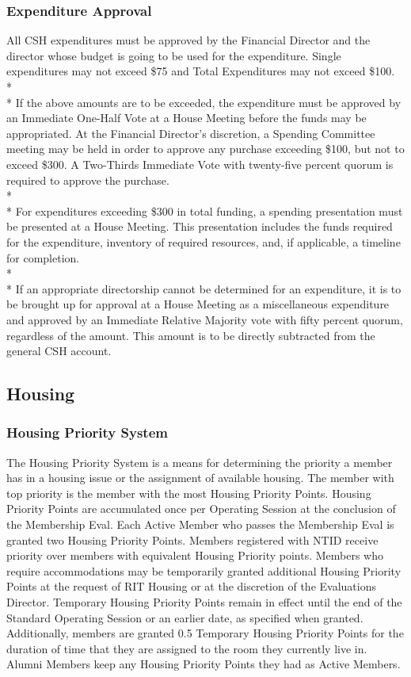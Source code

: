 \documentclass{article}
\newcommand{\asection}[1]{\subsection{#1} \label{#1}}
\newcommand{\asubsection}[1]{\subsubsection{#1} \label{#1}}
\begin{document}
\asubsection{Expenditure Approval}
All CSH expenditures must be approved by the Financial Director and the director whose budget is going to be used for the expenditure.
Single expenditures may not exceed \$75 and Total Expenditures may not exceed \$100.
\\* \\*
If the above amounts are to be exceeded, the expenditure must be approved by an Immediate One-Half Vote at a House Meeting before the funds may be appropriated.
At the Financial Director's discretion, a Spending Committee meeting may be held in order to approve any purchase exceeding \$100, but not to exceed \$300.
A Two-Thirds Immediate Vote with twenty-five percent quorum is required to approve the purchase.
\\*\\*
For expenditures exceeding \$300 in total funding, a spending presentation must be presented at a House Meeting.
This presentation includes the funds required for the expenditure, inventory of required resources, and, if applicable, a timeline for completion.
\\* \\*
If an appropriate directorship cannot be determined for an expenditure, it is to be brought up for approval at a House Meeting as a miscellaneous expenditure and approved by an Immediate Relative Majority vote with fifty percent quorum, regardless of the amount.
This amount is to be directly subtracted from the general CSH account.
\asection{Housing}

\asubsection{Housing Priority System}
The Housing Priority System is a means for determining the priority a member has in a housing issue or the assignment of available housing.
The member with top priority is the member with the most Housing Priority Points.
Housing Priority Points are accumulated once per Operating Session at the conclusion of the Membership Eval.
Each Active Member who passes the Membership Eval is granted two Housing Priority Points. 
Members registered with NTID receive priority over members with equivalent Housing Priority points. %
Members who require accommodations may be temporarily granted additional Housing Priority Points at the request of RIT Housing or at the discretion of the Evaluations Director. 
Temporary Housing Priority Points remain in effect until the end of the Standard Operating Session or an earlier date, as specified when granted.
Additionally, members are granted 0.5 Temporary Housing Priority Points for the duration of time that they are assigned to the room they currently live in. 
Alumni Members keep any Housing Priority Points they had as Active Members.
\end{document}
